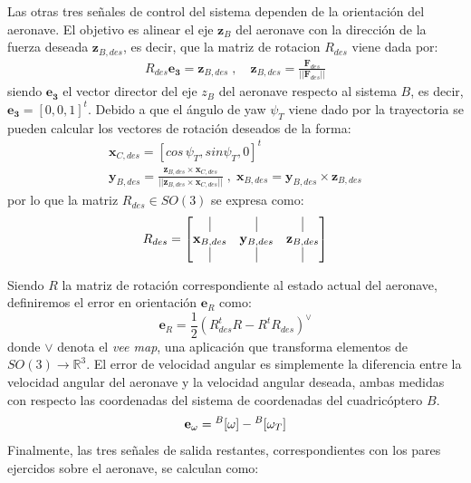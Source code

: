 Las otras tres señales de control del sistema dependen de la orientación del aeronave. El objetivo es alinear el eje $\mathbf{z}_B$ del aeronave con la dirección de la fuerza deseada $\mathbf{z}_{B,des}$, es decir, que la matriz de rotacion $R_{des}$ viene dada por:
\begin{align}	
	R_{des}\mathbf{e_3} = \mathbf{z}_{B,des}\;,\quad 
\mathbf{z}_{B,des} = \frac{\mathbf{F}_{des}}{||\mathbf{F}_{des}||}
\end{align}
siendo $\mathbf{e_3}$ el vector director del eje $z_B$ del aeronave respecto al sistema $B$, es decir, $\mathbf{e_3} = [0, 0, 1]^t$.
Debido a que el ángulo de yaw $\psi_T$ viene dado por la trayectoria se pueden calcular los vectores de rotación deseados de la forma:
\begin{gather}
	\mathbf{x}_{C,des} = [cos\, \psi_T , sin \psi_T, 0]^t\\
	\mathbf{y}_{B,des} = \frac{\mathbf{z}_{B,des}\times\mathbf{x}_{C,des}}{||\mathbf{z}_{B,des}\times\mathbf{x}_{C,des}||}\;,\; \mathbf{x}_{B,des} = \mathbf{y}_{B,des} \times\mathbf{z}_{B,des}
\end{gather}
por lo que la matriz $R_{des} \in SO(3)$ se expresa como:
\begin{equation}
	R_{des}=
	\begin{bmatrix}
		\vrule&\vrule&\vrule\\
		\mathbf{x}_{B,des}&\mathbf{y}_{B,des}&\mathbf{z}_{B,des}\\
		\vrule&\vrule&\vrule
	\end{bmatrix}
\end{equation}

Siendo $R$ la matriz de rotación correspondiente al estado actual del aeronave, definiremos el error en orientación $\mathbf{e}_R $ como:
\begin{equation}
	\mathbf{e}_R = \frac{1}{2}\left(R_{des}^t R - R^t R_{des} \right)^\vee
\end{equation}
donde $\vee$ denota el \textit{vee map}, una aplicación que transforma elementos de $SO(3) \rightarrow \mathbb{R}^3$. El error de velocidad angular es simplemente la diferencia entre la velocidad angular del aeronave y la velocidad angular deseada, ambas medidas con respecto las coordenadas del sistema de coordenadas del cuadricóptero $B$.
\begin{equation}
	\mathbf{e}_\omega = \null^B[\omega]-\null^B[\omega_T] 
\end{equation}
Finalmente, las tres señales de salida restantes, correspondientes con los pares ejercidos sobre el aeronave, se calculan como:

